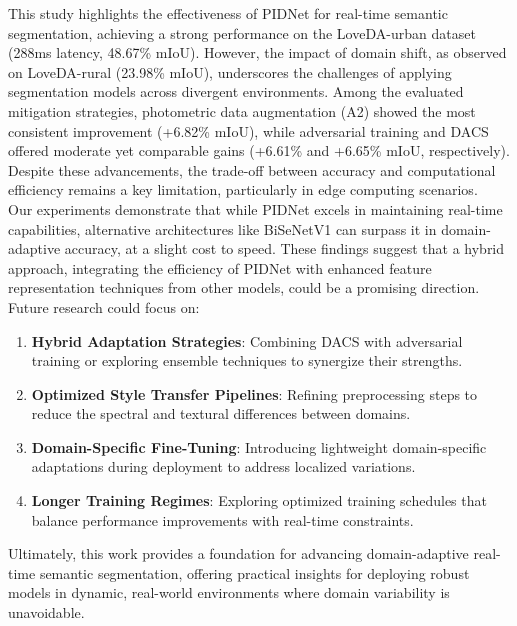 \documentclass{article}
\begin{document}
\begin{multicols}{2}
		This study highlights the effectiveness of PIDNet for real-time semantic segmentation, achieving a strong performance on the LoveDA-urban dataset (288ms latency, 48.67\% mIoU). However, the impact of domain shift, as observed on LoveDA-rural (23.98\% mIoU), underscores the challenges of applying segmentation models across divergent environments. Among the evaluated mitigation strategies, photometric data augmentation (A2) showed the most consistent improvement (+6.82\% mIoU), while adversarial training and DACS offered moderate yet comparable gains (+6.61\% and +6.65\% mIoU, respectively). Despite these advancements, the trade-off between accuracy and computational efficiency remains a key limitation, particularly in edge computing scenarios. 
		\\
		Our experiments demonstrate that while PIDNet excels in maintaining real-time capabilities, alternative architectures like BiSeNetV1 can surpass it in domain-adaptive accuracy, at a slight cost to speed. These findings suggest that a hybrid approach, integrating the efficiency of PIDNet with enhanced feature representation techniques from other models, could be a promising direction.
		Future research could focus on:

		\begin{enumerate}
			\item \textbf {Hybrid Adaptation Strategies}: Combining DACS with adversarial training or exploring ensemble techniques to synergize their strengths.
			\item \textbf {Optimized Style Transfer Pipelines}: Refining preprocessing steps to reduce the spectral and textural differences between domains.
			\item \textbf {Domain-Specific Fine-Tuning}: Introducing lightweight domain-specific adaptations during deployment to address localized variations.
			\item \textbf {Longer Training Regimes}: Exploring optimized training schedules that balance performance improvements with real-time constraints.
		\end{enumerate}
		
		Ultimately, this work provides a foundation for advancing domain-adaptive real-time semantic segmentation, offering practical insights for deploying robust models in dynamic, real-world environments where domain variability is unavoidable.
		

		
	\end{multicols}
	
	
	
	
\end{document}
